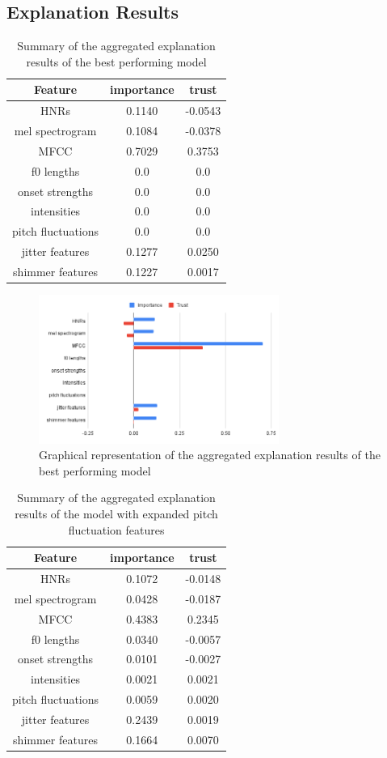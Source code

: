 \documentclass{article}
\begin{document}
		\subsection{Explanation Results}
		\begin{table}[htbp]
			\centering
			\begin{tabular}{c | c | c}
				Feature & importance & trust \\
				\hline
				HNRs & 0.1140 & -0.0543 \\
				mel spectrogram & 0.1084 & -0.0378 \\
				MFCC & 0.7029 & 0.3753 \\
				f0 lengths & 0.0 & 0.0 \\
				onset strengths & 0.0 & 0.0 \\
				intensities & 0.0 & 0.0 \\
				pitch fluctuations & 0.0 & 0.0 \\
				jitter features & 0.1277 & 0.0250 \\
				shimmer features & 0.1227 & 0.0017
			\end{tabular}
			\caption{Summary of the aggregated explanation results of the best performing model}
			\label{table:exp-results-cterm}
		\end{table}
		\begin{figure}
			\centering
			\includegraphics[width=0.7\textwidth]{images/exp_cterm.png}
			\caption{Graphical representation of the aggregated explanation results of the best
			performing model}
			\label{fig:exp_cterm}
		\end{figure}
		\begin{table}[htbp]
			\centering
			\begin{tabular}{c | c | c}
				Feature & importance & trust \\
				\hline
				HNRs & 0.1072 & -0.0148 \\
				mel spectrogram & 0.0428 & -0.0187 \\
				MFCC & 0.4383 & 0.2345 \\
				f0 lengths & 0.0340 & -0.0057 \\
				onset strengths & 0.0101 & -0.0027 \\
				intensities & 0.0021 & 0.0021 \\
				pitch fluctuations & 0.0059 & 0.0020 \\
				jitter features & 0.2439 & 0.0019 \\
				shimmer features & 0.1664 & 0.0070
			\end{tabular}
			\caption{Summary of the aggregated explanation results of the model with expanded
			pitch fluctuation features}
			\label{table:exp-results-more-pitch-flucs}
		\end{table}
\end{document}
